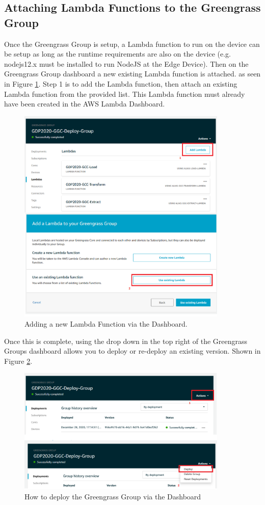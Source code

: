 \subsection{Attaching Lambda Functions to the Greengrass Group}
Once the Greengrass Group is setup, a Lambda function to run on the device can be setup as long as the runtime requirements are also on the device (e.g. nodejs12.x must be installed to run NodeJS at the Edge Device). Then on the Greengrass Group dashboard a new existing Lambda function is attached. as seen in Figure \ref{fig:adding_new_lambda_to_ggc}. Step 1 is to add the Lambda function, then attach an existing Lambda function from the provided list. This Lambda function must already have been created in the AWS Lambda Dashboard.

\begin{figure}[ht]
    \centering
    \includegraphics[width=100mm, scale=0.5]{pages/Chapter4/Chapter 4 Images/greengrass_new_lambda.png}
    \caption{Adding a new Lambda Function via the Dashboard.}
    \label{fig:adding_new_lambda_to_ggc}
\end{figure}

Once this is complete, using the drop down in the top right of the Greengrass Groups dashboard allows you to deploy or re-deploy an existing version. Shown in Figure \ref{fig:deploy_on_dashboard}.

\begin{figure}[ht]
    \centering
    \includegraphics[width=100mm, scale=0.5]{pages/Chapter4/Chapter 4 Images/deploy_group.png}
    \caption{How to deploy the Greengrass Group via the Dashboard}
    \label{fig:deploy_on_dashboard}
\end{figure}


